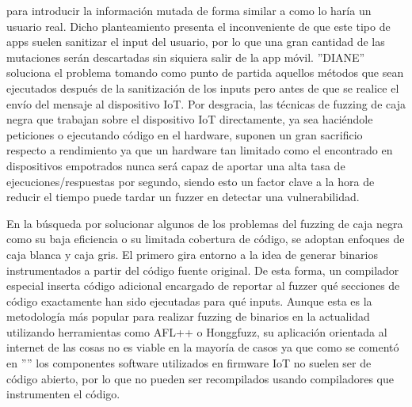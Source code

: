para introducir la información mutada de forma similar a como lo haría un usuario real. Dicho planteamiento presenta el inconveniente de que este tipo 
de apps suelen sanitizar el input del usuario, por lo que una gran cantidad de las mutaciones serán descartadas sin siquiera salir de la app móvil.
''DIANE'' soluciona el problema tomando como punto de partida aquellos métodos que sean ejecutados después de la sanitización de los inputs pero antes de
que se realice el envío del mensaje al dispositivo IoT. Por desgracia, las técnicas de fuzzing de caja negra que trabajan sobre el dispositivo IoT
directamente, ya sea haciéndole peticiones o ejecutando código en el hardware, suponen un gran sacrificio respecto a rendimiento ya que un hardware 
tan limitado como el encontrado en dispositivos empotrados nunca será capaz de aportar una alta tasa de ejecuciones/respuestas por segundo, siendo esto un 
factor clave a la hora de reducir el tiempo puede tardar un fuzzer en detectar una vulnerabilidad.

En la búsqueda por solucionar algunos de los problemas del fuzzing de caja negra como su baja eficiencia o su limitada cobertura de código, se 
adoptan enfoques de caja blanca y caja gris. El primero gira entorno a la idea de generar binarios instrumentados a partir del código fuente original. De esta forma, un compilador 
especial inserta código adicional encargado de reportar al fuzzer qué secciones de código exactamente han sido ejecutadas para qué inputs.
Aunque esta es la metodología más popular para realizar fuzzing de binarios en la actualidad utilizando herramientas como AFL++\cite{afl++} o 
Honggfuzz\cite{honggfuzz}, su aplicación orientada al internet de las cosas no es viable en la mayoría de casos ya que como se comentó en 
'''' los componentes software utilizados en firmware IoT no suelen ser de código abierto, por lo que no pueden ser recompilados 
usando compiladores que instrumenten el código.\bigskip

